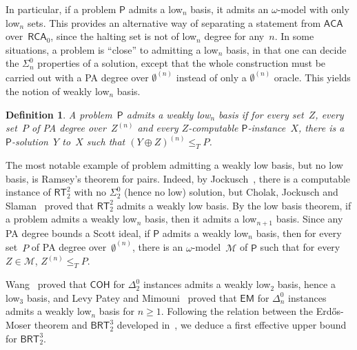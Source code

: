 \documentclass{article}
\newcommand{\Psf}{\mathsf{P}}
\def\M{\mathcal{M}}
\newcommand{\RCA}[0]{\mathsf{RCA}}
\newcommand{\ACA}[0]{\mathsf{ACA}}
\newcommand{\EM}[0]{\mathsf{EM}}
\newcommand{\RT}[0]{\mathsf{RT}}
\newcommand{\COH}[0]{\mathsf{COH}}
\newcommand{\BRT}[0]{\mathsf{BRT}}
\def\qt#1{``#1''}%
\numberwithin{theorem}{section}
\newtheorem{definition}[theorem]{Definition}
\begin{document}
In particular, if a problem $\Psf$ admits a low${}_n$ basis, it admits an $\omega$-model with only low${}_n$ sets. This provides an alternative way of separating a statement from $\ACA$ over~$\RCA_0$, since the halting set is not of low${}_n$ degree for any~$n$. In some situations, a problem is \qt{close} to admitting a low${}_n$ basis, in that one can decide the $\Sigma^0_n$ properties of a solution, except that the whole construction must be carried out with a PA degree over $\emptyset^{(n)}$ instead of only a $\emptyset^{(n)}$ oracle. This yields the notion of weakly low${}_n$ basis.

\begin{definition}
A problem~$\Psf$ admits a \emph{weakly low${}_n$ basis} if for every set~$Z$, every set~$P$ of PA degree over~$Z^{(n)}$ and every $Z$-computable $\Psf$-instance~$X$, there is a $\Psf$-solution~$Y$ to~$X$ such that $(Y \oplus Z)^{(n)} \leq_T P$.
\end{definition}

The most notable example of problem admitting a weakly low basis, but no low basis, is Ramsey's theorem for pairs. Indeed, by Jockusch~\cite{jockusch_ramseys_1972}, there is a computable instance of $\RT^2_2$ with no $\Sigma^0_2$ (hence no low) solution, but Cholak, Jockusch and Slaman~\cite{cholak2001strength} proved that $\RT^2_2$ admits a weakly low basis. By the low basis theorem, if a problem admits a weakly low${}_n$ basis, then it admits a low${}_{n+1}$ basis. Since any PA degree bounds a Scott ideal, if $\Psf$ admits a weakly low${}_n$ basis, then for every set~$P$ of PA degree over~$\emptyset^{(n)}$, there is an $\omega$-model~$\M$ of $\Psf$ such that for every $Z \in \M$, $Z^{(n)} \leq_T P$. 

Wang~\cite{wang_cohesive_2014} proved that $\COH$ for $\Delta^0_2$ instances admits a weakly low${}_2$ basis, hence a low${}_3$ basis, and Levy Patey and Mimouni~\cite[Theorem 7.1]{levy2025weakness} proved that $\EM$ for $\Delta^0_n$ instances admits a weakly low${}_n$ basis for $n \geq 1$. Following the relation between the Erd\H{o}s-Moser theorem and $\BRT^3_2$ developed in~, we deduce a first effective upper bound for $\BRT^3_2$.
\end{document}
